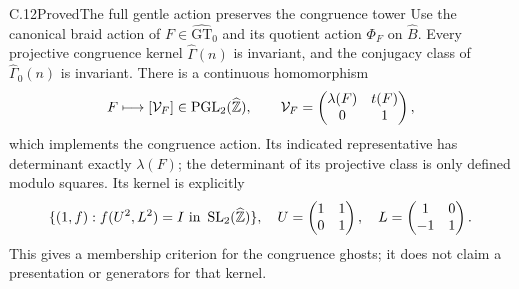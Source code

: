 \begin{statement}{C.12}{Proved}{The full gentle action preserves the congruence tower}
Use the canonical braid action of $F\in\widehat{\mathrm{GT}}_0$
and its quotient action $\Phi_F$ on $\widehat B$.
Every projective congruence kernel $\widehat\Gamma(n)$ is invariant,
and the conjugacy class of $\widehat\Gamma_0(n)$ is invariant.
There is a continuous homomorphism
\[
 F\longmapsto\left[\mathcal V_F\right]\in
       \operatorname{PGL}_2(\widehat{\mathbb Z}),\qquad
 \mathcal V_F=\begin{pmatrix}\lambda(F)&t(F)\\0&1\end{pmatrix},
\]
which implements the congruence action. Its indicated representative
has determinant exactly $\lambda(F)$; the determinant of its
projective class is only defined modulo squares. Its kernel is
explicitly
\[
 \{(1,f):f(U^2,L^2)=I\text{ in }
                \operatorname{SL}_2(\widehat{\mathbb Z})\},
 \quad
 U=\begin{pmatrix}1&1\\0&1\end{pmatrix},\quad
 L=\begin{pmatrix}1&0\\-1&1\end{pmatrix}.
\]
This gives a membership criterion for the congruence ghosts;
it does not claim a presentation or generators for that kernel.
\end{statement}
